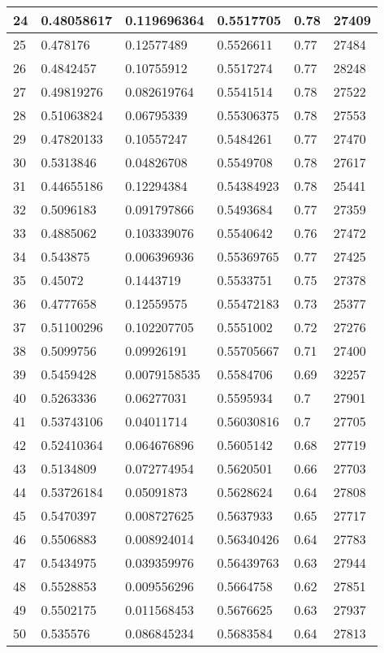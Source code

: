 \begin{longtable}{|l|l|l|l|l|l|}
24 & 0.48058617 & 0.119696364 & 0.5517705 & 0.78 & 27409 \\ \hline 
25 & 0.478176 & 0.12577489 & 0.5526611 & 0.77 & 27484 \\ \hline 
26 & 0.4842457 & 0.10755912 & 0.5517274 & 0.77 & 28248 \\ \hline 
27 & 0.49819276 & 0.082619764 & 0.5541514 & 0.78 & 27522 \\ \hline 
28 & 0.51063824 & 0.06795339 & 0.55306375 & 0.78 & 27553 \\ \hline 
29 & 0.47820133 & 0.10557247 & 0.5484261 & 0.77 & 27470 \\ \hline 
30 & 0.5313846 & 0.04826708 & 0.5549708 & 0.78 & 27617 \\ \hline 
31 & 0.44655186 & 0.12294384 & 0.54384923 & 0.78 & 25441 \\ \hline 
32 & 0.5096183 & 0.091797866 & 0.5493684 & 0.77 & 27359 \\ \hline 
33 & 0.4885062 & 0.103339076 & 0.5540642 & 0.76 & 27472 \\ \hline 
34 & 0.543875 & 0.006396936 & 0.55369765 & 0.77 & 27425 \\ \hline 
35 & 0.45072 & 0.1443719 & 0.5533751 & 0.75 & 27378 \\ \hline 
36 & 0.4777658 & 0.12559575 & 0.55472183 & 0.73 & 25377 \\ \hline 
37 & 0.51100296 & 0.102207705 & 0.5551002 & 0.72 & 27276 \\ \hline 
38 & 0.5099756 & 0.09926191 & 0.55705667 & 0.71 & 27400 \\ \hline 
39 & 0.5459428 & 0.0079158535 & 0.5584706 & 0.69 & 32257 \\ \hline 
40 & 0.5263336 & 0.06277031 & 0.5595934 & 0.7 & 27901 \\ \hline 
41 & 0.53743106 & 0.04011714 & 0.56030816 & 0.7 & 27705 \\ \hline 
42 & 0.52410364 & 0.064676896 & 0.5605142 & 0.68 & 27719 \\ \hline 
43 & 0.5134809 & 0.072774954 & 0.5620501 & 0.66 & 27703 \\ \hline 
44 & 0.53726184 & 0.05091873 & 0.5628624 & 0.64 & 27808 \\ \hline 
45 & 0.5470397 & 0.008727625 & 0.5637933 & 0.65 & 27717 \\ \hline 
46 & 0.5506883 & 0.008924014 & 0.56340426 & 0.64 & 27783 \\ \hline 
47 & 0.5434975 & 0.039359976 & 0.56439763 & 0.63 & 27944 \\ \hline 
48 & 0.5528853 & 0.009556296 & 0.5664758 & 0.62 & 27851 \\ \hline 
49 & 0.5502175 & 0.011568453 & 0.5676625 & 0.63 & 27937 \\ \hline 
50 & 0.535576 & 0.086845234 & 0.5683584 & 0.64 & 27813 \\ \hline 
\end{longtable}